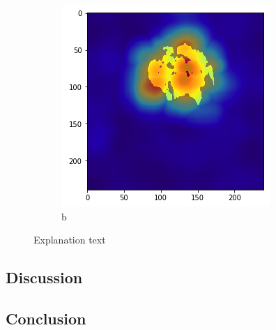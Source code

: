 \begin{figure}[H]
\begin{subfigure}{.5\textwidth}
        \includegraphics[width=\linewidth]{chapters/04_segmentation/images/rise_multipixel_max_1-1.png}
        \caption{b}
    \end{subfigure}
    \caption{Explanation text}
\end{figure}

\subsection{Discussion}

\subsection{Conclusion}
